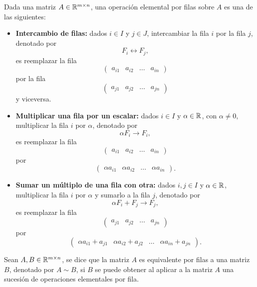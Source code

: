 \documentclass[a4,11pt]{aleph-notas}
\begin{document}
\begin{defi}
    Dada una matriz $A\in\R^{m \times n}$, una operación elemental por filas sobre $A$ es una de las siguientes:
    \begin{itemize}
    \item   
        \textbf{Intercambio de filas:} dados $i\in I$ y $j\in J$, intercambiar la fila $i$ por la fila $j$, denotado por
        \[
            F_i \leftrightarrow F_j,
        \]
        es reemplazar la fila
        \[
            \begin{pmatrix}a_{i1}&a_{i2}&\ldots& a_{in}\end{pmatrix}
        \]
        por la fila
        \[
            \begin{pmatrix}a_{j1}&a_{j2}&\ldots& a_{jn}\end{pmatrix}
        \]
        y viceversa.
    \item 
        \textbf{Multiplicar una fila por un escalar:} dados $i\in I$ y $\alpha\in \R$, con $\alpha\neq 0$, multiplicar la fila $i$ por $\alpha$, denotado por
        \[
            \alpha F_i \rightarrow F_i,
        \]
        es reemplazar la fila
        \[
            \begin{pmatrix}a_{i1}&a_{i2}&\ldots& a_{in}\end{pmatrix}
        \]
        por 
        \[
            \begin{pmatrix}\alpha a_{i1}&\alpha a_{i2}&\ldots&\alpha a_{in}\end{pmatrix}.
        \]
    \item 
        \textbf{Sumar un múltiplo de una fila con otra:} dados $i,j\in I$ y $\alpha\in \R$, multiplicar la fila $i$ por $\alpha$ y sumarlo a la fila $j$, denotado por
        \[
            \alpha F_i + F_j\rightarrow F_j,
        \]
        es reemplazar la fila
        \[
            \begin{pmatrix}a_{j1}&a_{j2}&\ldots& a_{jn}\end{pmatrix}
        \]
        por 
        \[
            \begin{pmatrix}\alpha a_{i1} + a_{j1}&\alpha a_{i2} + a_{j2}&\ldots&\alpha a_{in} + a_{jn}\end{pmatrix}.
        \]
\end{itemize}
\end{defi}




\begin{defi}
    Sean $A,B\in \Mat[\R]{m}{n}$, se dice que la matriz $A$ es equivalente por filas a una matriz $B$, denotado por $A\sim B$, si $B$ se puede obtener al aplicar a la matriz $A$ una sucesión de operaciones elementales por fila.
\end{defi}
\end{document}
